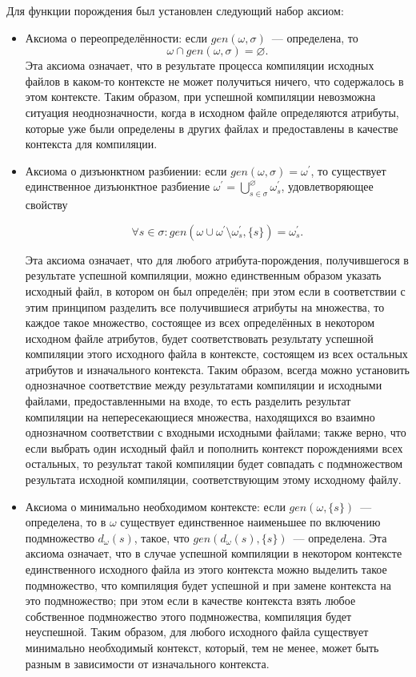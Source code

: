 Для функции порождения был установлен следующий набор аксиом:

\begin{itemize}
	\item Аксиома о переопределённости: если $gen(\omega,\sigma)$~--- определена, то $$\omega \cap gen(\omega,\sigma) = \varnothing.$$
	Эта аксиома означает, что в результате процесса компиляции исходных файлов в каком-то контексте не может получиться ничего, что содержалось в этом контексте. Таким образом, при успешной компиляции невозможна ситуация неоднозначности, когда в исходном файле определяются атрибуты, которые уже были определены в других файлах и предоставлены в качестве контекста для компиляции.
	
	\item Аксиома о дизъюнктном разбиении: если $gen(\omega,\sigma) = \omega^\prime$, то существует единственное дизъюнктное разбиение $\omega^\prime=\bigcup^\varnothing_{s\in\sigma}\omega^\prime_s$, 
	удовлетворяющее свойству 

	$$\forall s\in\sigma : gen(\omega\cup\omega^\prime\setminus\omega^\prime_s,\{s\})=\omega^\prime_s.$$
	
	Эта аксиома означает, что для любого атрибута-порождения, получившегося в результате успешной компиляции, можно единственным образом указать исходный файл, в котором он был определён; при этом если в соответствии с этим принципом разделить все получившиеся атрибуты на множества, то каждое такое множество, состоящее из всех определённых в некотором исходном файле атрибутов, будет соответствовать результату успешной компиляции этого исходного файла в контексте, состоящем из всех остальных атрибутов и изначального контекста. Таким образом, всегда можно установить однозначное соответствие между результатами компиляции и исходными файлами, предоставленными на входе, то есть разделить результат компиляции на непересекающиеся множества, находящихся во взаимно однозначном соответствии с входными исходными файлами; также верно, что если выбрать один исходный файл и пополнить контекст порождениями всех остальных, то результат такой компиляции будет совпадать с подмножеством результата исходной компиляции, соответствующим этому исходному файлу.

	\item Аксиома о минимально необходимом контексте: если $gen(\omega,\{s\})$~--- определена, то в $\omega$ существует единственное наименьшее по включению подмножество $d_\omega(s)$, такое, что $gen(d_\omega(s), \{s\})$~--- определена. Эта аксиома означает, что в случае успешной компиляции в некотором контексте единственного исходного файла из этого контекста можно выделить такое подмножество, что компиляция будет успешной и при замене контекста на это подмножество; при этом если в качестве контекста взять любое собственное подмножество этого подмножества, компиляция будет неуспешной. Таким образом, для любого исходного файла существует минимально необходимый контекст, который, тем не менее, может быть разным в зависимости от изначального контекста.


\end{itemize}
